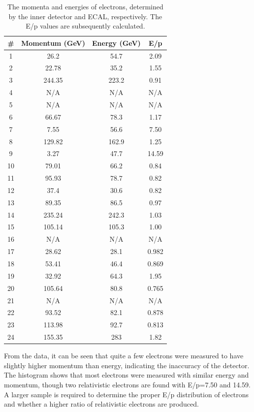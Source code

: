 \documentclass[twocolumn]{article}
\begin{document}
\begin{table} [!h]
\centering
\begin{tabular}{|c|c|c|c|}
\hline
\# & Momentum (GeV) & Energy (GeV) & E/p\\
\hline
1&	26.2&		54.7&	2.09\\\hline
2&	22.78&		35.2&	1.55\\\hline
3&	244.35&		223.2&	0.91\\\hline
4&	N/A &		N/A&	N/A\\\hline
5&	N/A	&		N/A&	N/A\\\hline
6&	66.67&		78.3&	1.17\\\hline
7&	7.55&		56.6&	7.50\\\hline
8&	129.82&		162.9&	1.25\\\hline
9&	3.27&		47.7&	14.59\\\hline
10&	79.01&		66.2&	0.84\\\hline
11&	95.93&		78.7&	0.82\\\hline
12&	37.4&		30.6&	0.82\\\hline
13&	89.35&		86.5&	0.97\\\hline
14&	235.24&		242.3&	1.03\\\hline
15&	105.14&		105.3&	1.00\\\hline
16&	N/A	  &		N/A&	N/A\\\hline
17&	28.62&		28.1&	0.982\\\hline
18&	53.41&		46.4&	0.869\\\hline
19&	32.92&		64.3&	1.95\\\hline
20&	105.64&		80.8&	0.765\\\hline
21&	N/A	  &		N/A&	N/A\\\hline
22&	93.52&		82.1&	0.878\\\hline
23&	113.98&		92.7&	0.813\\\hline
24&	155.35&		283&	1.82\\\hline
\end{tabular}
\caption{The momenta and energies of electrons, determined by the inner detector and ECAL, respectively. The E/p values are subsequently calculated.}
\label{tab:electron}
\end{table}
From the data, it can be seen that quite a few electrons were measured to have slightly higher momentum than energy, indicating the inaccuracy of the detector. The histogram shows that most electrons were measured with similar energy and momentum, though two relativistic electrons are found with E/p=7.50 and 14.59. A larger sample is required to determine the proper E/p distribution of electrons and whether a higher ratio of relativistic electrons are produced.
\end{document}

